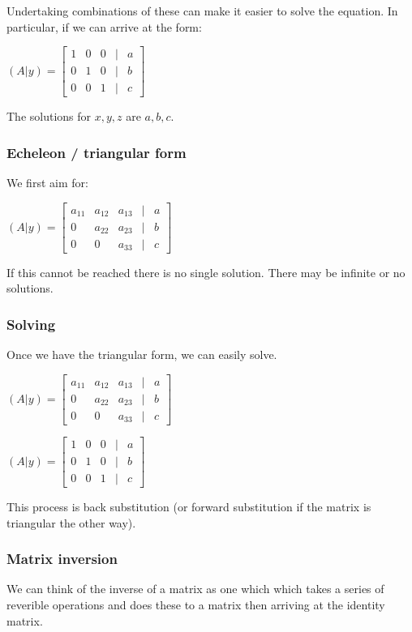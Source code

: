 Undertaking combinations of these can make it easier to solve the equation. In particular, if we can arrive at the form:

\((A|y)=\begin{bmatrix}1 & 0&0&|&a\\0 & 1&0&|&b\\0&0&1&|&c\end{bmatrix}\)

The solutions for \(x,y,z\) are \(a,b,c\).

\subsubsection{Echeleon / triangular form}

We first aim for:

\((A|y)=\begin{bmatrix}a_{11} & a_{12}&a_{13}&|&a\\0 & a_{22}&a_{23}&|&b\\0&0&a_{33}&|&c\end{bmatrix}\)

If this cannot be reached there is no single solution. There may be infinite or no solutions.

\subsubsection{Solving}

Once we have the triangular form, we can easily solve.

\((A|y)=\begin{bmatrix}a_{11} & a_{12}&a_{13}&|&a\\0 & a_{22}&a_{23}&|&b\\0&0&a_{33}&|&c\end{bmatrix}\)

\((A|y)=\begin{bmatrix}1 & 0&0&|&a\\0 & 1&0&|&b\\0&0&1&|&c\end{bmatrix}\)

This process is back substitution (or forward substitution if the matrix is triangular the other way).

\subsubsection{Matrix inversion}

We can think of the inverse of a matrix as one which which takes a series of reverible operations and does these to a matrix then arriving at the identity matrix.

